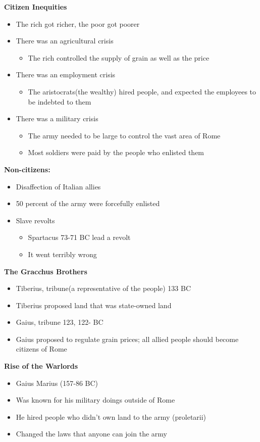 \documentclass[12pt,a4paper]{report}
\begin{document}
\textbf{Citizen Inequities}
\begin{itemize}
\item The rich got richer, the poor got poorer
\item There was an agricultural crisis
\begin{itemize}
\item The rich controlled the supply of grain as well as the price
\end{itemize}
\item There was an employment crisis
\begin{itemize}
\item The aristocrats(the wealthy) hired people, and expected the employees to be indebted to them
\end{itemize}
\item There was a military crisis
\begin{itemize}
\item The army needed to be large to control the vast area of Rome
\item Most soldiers were paid by the people who enlisted them
\end{itemize}
\end{itemize}
\textbf{Non-citizens:}
\begin{itemize}
\item Disaffection of Italian allies
\item 50 percent of the army were forcefully enlisted
\item Slave revolts
\begin{itemize}
\item Spartacus 73-71 BC lead a revolt
\item It went terribly wrong
\end{itemize}
\end{itemize}
\textbf{The Gracchus Brothers}
\begin{itemize}
\item Tiberius, tribune(a representative of the people) 133 BC
\item Tiberius proposed land that was state-owned land
\item Gaius, tribune 123, 122- BC
\item Gaius proposed to regulate grain prices; all allied people should become citizens of Rome
\end{itemize}
\textbf{Rise of the Warlords}
\begin{itemize}
\item Gaius Marius (157-86 BC)
\item Was known for his military doings outside of Rome
\item He hired people who didn't own land to the army (proletarii)
\item Changed the laws that anyone can join the army
\end{itemize}
\end{document}
